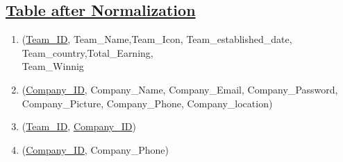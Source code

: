 \subsection*{\underline{Table after Normalization}}
\begin{enumerate}
    \item (\underline{Team\_ID}, Team\_Name,Team\_Icon, Team\_established\_date, Team\_country,Total\_Earning,\\Team\_Winnig
    \item (\underline{Company\_ID}, Company\_Name, Company\_Email, Company\_Password, Company\_Picture, Company\_Phone, Company\_location)
    \item (\underline{Team\_ID}, \underline{Company\_ID})
    \item (\underline{Company\_ID}, Company\_Phone)
\end{enumerate}


\clearpage
